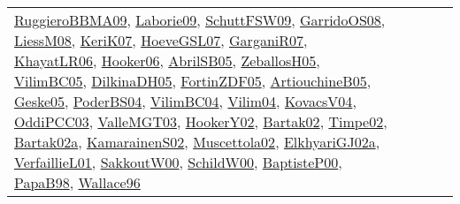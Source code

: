 {\begin{longtable}{lp{3cm}>{\raggedright}p{6cm}>{\raggedright}p{6cm}p{8cm}}
\href{articles/RuggieroBBMA09.pdf}{RuggieroBBMA09}\cite{RuggieroBBMA09}, \href{papers/Laborie09.pdf}{Laborie09}\cite{Laborie09}, \href{papers/SchuttFSW09.pdf}{SchuttFSW09}\cite{SchuttFSW09}, \href{articles/GarridoOS08.pdf}{GarridoOS08}\cite{GarridoOS08}, \href{articles/LiessM08.pdf}{LiessM08}\cite{LiessM08}, \href{papers/KeriK07.pdf}{KeriK07}\cite{KeriK07}, \href{papers/HoeveGSL07.pdf}{HoeveGSL07}\cite{HoeveGSL07}, \href{papers/GarganiR07.pdf}{GarganiR07}\cite{GarganiR07}, \href{articles/KhayatLR06.pdf}{KhayatLR06}\cite{KhayatLR06}, \href{articles/Hooker06.pdf}{Hooker06}\cite{Hooker06}, \href{papers/AbrilSB05.pdf}{AbrilSB05}\cite{AbrilSB05}, \href{articles/ZeballosH05.pdf}{ZeballosH05}\cite{ZeballosH05}, \href{articles/VilimBC05.pdf}{VilimBC05}\cite{VilimBC05}, \href{papers/DilkinaDH05.pdf}{DilkinaDH05}\cite{DilkinaDH05}, \href{papers/FortinZDF05.pdf}{FortinZDF05}\cite{FortinZDF05}, \href{papers/ArtiouchineB05.pdf}{ArtiouchineB05}\cite{ArtiouchineB05}, \href{papers/Geske05.pdf}{Geske05}\cite{Geske05}, \href{articles/PoderBS04.pdf}{PoderBS04}\cite{PoderBS04}, \href{papers/VilimBC04.pdf}{VilimBC04}\cite{VilimBC04}, \href{papers/Vilim04.pdf}{Vilim04}\cite{Vilim04}, \href{papers/KovacsV04.pdf}{KovacsV04}\cite{KovacsV04}, \href{papers/OddiPCC03.pdf}{OddiPCC03}\cite{OddiPCC03}, \href{papers/ValleMGT03.pdf}{ValleMGT03}\cite{ValleMGT03}, \href{papers/HookerY02.pdf}{HookerY02}\cite{HookerY02}, \href{papers/Bartak02.pdf}{Bartak02}\cite{Bartak02}, \href{articles/Timpe02.pdf}{Timpe02}\cite{Timpe02}, \href{papers/Bartak02a.pdf}{Bartak02a}\cite{Bartak02a}, \href{papers/KamarainenS02.pdf}{KamarainenS02}\cite{KamarainenS02}, \href{papers/Muscettola02.pdf}{Muscettola02}\cite{Muscettola02}, \href{papers/ElkhyariGJ02a.pdf}{ElkhyariGJ02a}\cite{ElkhyariGJ02a}, \href{papers/VerfaillieL01.pdf}{VerfaillieL01}\cite{VerfaillieL01}, \href{articles/SakkoutW00.pdf}{SakkoutW00}\cite{SakkoutW00}, \href{articles/SchildW00.pdf}{SchildW00}\cite{SchildW00}, \href{articles/BaptisteP00.pdf}{BaptisteP00}\cite{BaptisteP00}, \href{articles/PapaB98.pdf}{PapaB98}\cite{PapaB98}, \href{articles/Wallace96.pdf}{Wallace96}\cite{Wallace96}\\

\end{longtable}}
